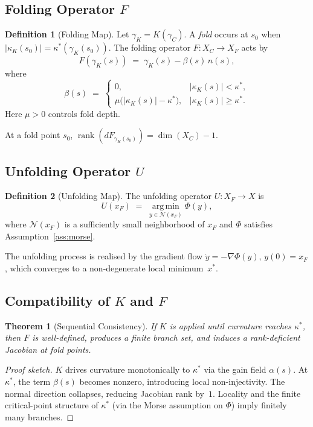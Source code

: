 \documentclass[12pt, oneside]{book}
\theoremstyle{plain}
\newtheorem{theorem}{Theorem}[section]
\theoremstyle{definition}
\newtheorem{definition}{Definition}[section]
\theoremstyle{remark}
\begin{document}
\subsection{Folding Operator \texorpdfstring{$F$}{F}}

\begin{definition}[Folding Map]
Let $\gamma_K = K(\gamma_C)$. A \emph{fold} occurs at $s_0$ when
$|\kappa_K(s_0)| = \kappa^*(\gamma_K(s_0))$. The folding operator
$F : X_C \to X_F$ acts by
\[
F(\gamma_K(s)) \;=\; \gamma_K(s) - \beta(s)\,n(s),
\]
where
\[
\beta(s) \;=\;
\begin{cases}
0, & |\kappa_K(s)| < \kappa^*, \\
\mu\bigl(|\kappa_K(s)| - \kappa^*\bigr), & |\kappa_K(s)| \ge \kappa^*.
\end{cases}
\]
Here $\mu > 0$ controls fold depth.
\end{definition}

At a fold point $s_0$,
$\operatorname{rank}(dF_{\gamma_K(s_0)}) = \dim(X_C) - 1$.

\subsection{Unfolding Operator \texorpdfstring{$U$}{U}}

\begin{definition}[Unfolding Map]
The unfolding operator $U : X_F \to X$ is
\[
U(x_F) \;=\; \operatorname*{arg\,min}_{y \in \mathcal{N}(x_F)}
  \Phi(y),
\]
where $\mathcal{N}(x_F)$ is a sufficiently small neighborhood of
$x_F$ and $\Phi$ satisfies Assumption~\ref{ass:morse}.
\end{definition}

The unfolding process is realised by the gradient flow
$\dot y = -\nabla\Phi(y)$, $y(0) = x_F$, which converges to a
non-degenerate local minimum~$x^*$.

\subsection{Compatibility of \texorpdfstring{$K$}{K} and
\texorpdfstring{$F$}{F}}

\begin{theorem}[Sequential Consistency]
If $K$ is applied until curvature reaches $\kappa^*$, then $F$ is
well-defined, produces a finite branch set, and induces a
rank-deficient Jacobian at fold points.
\end{theorem}

\begin{proof}[Proof sketch]
$K$ drives curvature monotonically to $\kappa^*$ via the gain field
$\alpha(s)$. At $\kappa^*$, the term $\beta(s)$ becomes nonzero,
introducing local non-injectivity. The normal direction collapses,
reducing Jacobian rank by~$1$. Locality and the finite critical-point
structure of $\kappa^*$ (via the Morse assumption on $\Phi$) imply
finitely many branches.
\end{proof}
\end{document}
